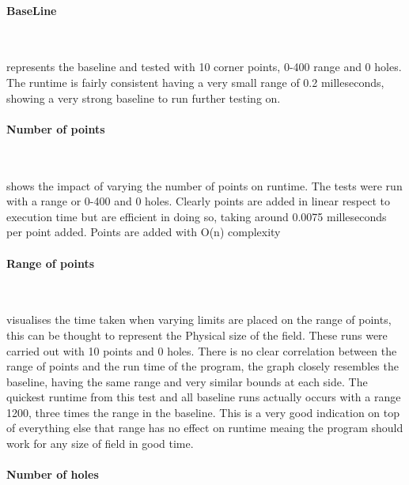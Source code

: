 \documentclass[final]{cmpreport_02}
\begin{document}
\paragraph{BaseLine} \

 represents the baseline and tested with 10 corner points, 0-400 range and 0 holes.
The runtime is fairly consistent having a very small range of 0.2 milleseconds, showing a very strong baseline to run further testing on.


\paragraph{Number of points} \

 shows the impact of varying the number of points on runtime.
The tests were run with a range or 0-400 and 0 holes.
Clearly points are added in linear respect to execution time but are efficient in doing so, taking around 0.0075 milleseconds per point added.
Points are added with O(n) complexity


\paragraph{Range of points} \

 visualises the time taken when varying limits are placed on the range of points, this can be thought to represent the Physical size of the field.
These runs were carried out with 10 points and 0 holes.
There is no clear correlation between the range of points and the run time of the program, the graph closely resembles the baseline, having the same range and very similar bounds at each side.
The quickest runtime from this test and all baseline runs actually occurs with a range 1200, three times the range in the baseline.
This is a very good indication on top of everything else that range has no effect on runtime meaing the program should work for any size of field in good time.

\paragraph{Number of holes} \
\end{document}
